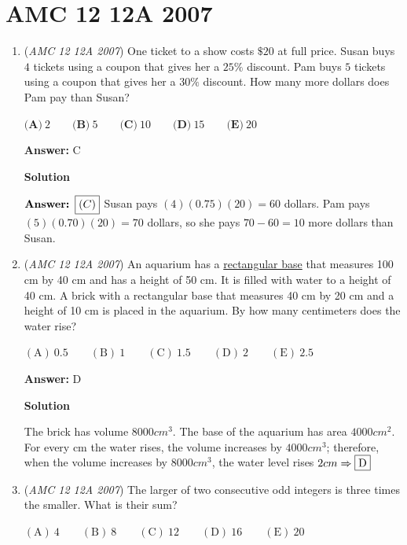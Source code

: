 \section{AMC 12 12A 2007}
        \begin{enumerate}
        	\item (\textit{AMC 12 12A 2007}) One ticket to a show costs $\$20$ at full price. Susan buys $4$ tickets using a coupon that gives her a $25\%$ discount. Pam buys $5$ tickets using a coupon that gives her a $30\%$ discount. How many more dollars does Pam pay than Susan?


 $\textbf{(A)} \ 2 \qquad \textbf{(B)} \ 5 \qquad \textbf{(C)} \ 10 \qquad \textbf{(D)} \ 15 \qquad \textbf{(E)} \ 20$

 \textbf{Answer: }C



\textbf{Solution}

$\textbf{Answer: \boxed{(C)}}$ Susan pays $(4)(0.75)(20) = 60$ dollars. Pam pays $(5)(0.70)(20) = 70$ dollars, so she pays $70-60=10$ more dollars than Susan.

 


	\item (\textit{AMC 12 12A 2007}) An aquarium has a \href{https://artofproblemsolving.com/wiki/index.php?title=Rectangular\_prism}{rectangular base} that measures 100 cm by 40 cm and has a height of 50 cm. It is filled with water to a height of 40 cm. A brick with a rectangular base that measures 40 cm by 20 cm and a height of 10 cm is placed in the aquarium. By how many centimeters does the water rise?


 $\mathrm{(A)}\ 0.5\qquad \mathrm{(B)}\ 1\qquad \mathrm{(C)}\ 1.5\qquad \mathrm{(D)}\ 2\qquad \mathrm{(E)}\ 2.5$

 \textbf{Answer: }D



\textbf{Solution}

The brick has volume $8000 cm^3$. The base of the aquarium has area $4000 cm^2$. For every cm the water rises, the volume increases by $4000 cm^3$; therefore, when the volume increases by $8000 cm^3$, the water level rises $2 cm \Rightarrow\fbox{D}$



	\item (\textit{AMC 12 12A 2007}) The larger of two consecutive odd integers is three times the smaller. What is their sum?


 $\mathrm{(A)}\ 4\qquad \mathrm{(B)}\ 8\qquad \mathrm{(C)}\ 12\qquad \mathrm{(D)}\ 16\qquad \mathrm{(E)}\ 20$


\end{enumerate}
